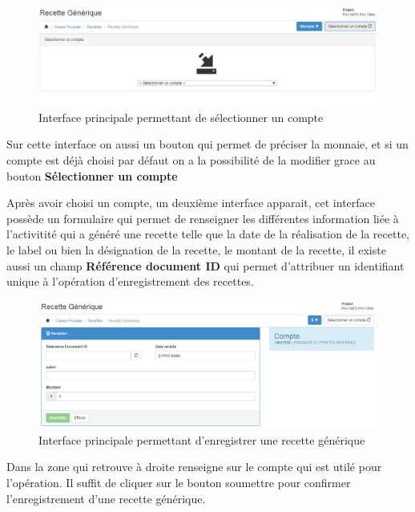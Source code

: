 \documentclass[12pt,a4paper]{report}
\begin{document}
\begin{figure}[h]
\begin{center}
\includegraphics[width=14cm]{pic/recetteGen.png}
\end{center}
\caption{Interface principale permettant de sélectionner un compte}
\label{Interface principale permettant de sélectionner un compte}
\end{figure}

Sur cette interface on aussi un bouton qui permet de préciser la monnaie, et si un compte est déjà choisi par défaut on a la possibilité de la modifier grace au bouton \textbf{Sélectionner un compte}

Après avoir choisi un compte, un deuxième interface apparait, cet interface possède un formulaire qui permet de renseigner les différentes information liée à l'activitité qui a généré une recette telle que la date de la réalisation de la recette, le label ou bien la désignation de la recette, le montant de la recette, il existe aussi un champ \textbf{Référence document ID} qui permet d'attribuer un identifiant unique à l'opération d'enregistrement des recettes.

\begin{figure}[h]
\begin{center}
\includegraphics[width=14cm]{pic/recetteGen2.png}
\end{center}
\caption{Interface principale permettant d'enregistrer une recette générique}
\label{Interface principale permettant d'enregistrer une recette générique}
\end{figure}

Dans la zone qui retrouve à droite renseigne sur le compte qui est utilé pour l'opération. Il suffit de cliquer sur le bouton soumettre pour confirmer l'enregistrement d'une recette générique.
\end{document}
